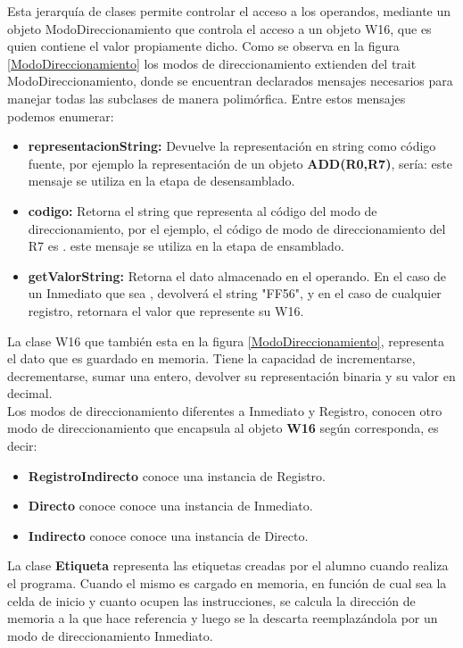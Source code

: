 Esta jerarquía de clases permite controlar el acceso a los operandos, mediante un objeto ModoDireccionamiento que controla el acceso a un objeto W16, que es quien contiene el valor propiamente dicho. 
Como se observa en la figura \ref{ModoDireccionamiento} los modos de direccionamiento extienden del trait ModoDireccionamiento, donde se encuentran declarados mensajes necesarios para manejar todas las subclases de manera polimórfica. Entre estos mensajes podemos enumerar:
\begin{itemize}
\item  \textbf{representacionString:}
Devuelve la representación en string como código fuente, por ejemplo la representación de un objeto
 \textbf{ADD(R0,R7)}, sería:  este mensaje se utiliza en la etapa de desensamblado.
\item  \textbf{codigo:}
Retorna el string que representa al código del modo de direccionamiento, por el ejemplo, el código de modo de direccionamiento del R7 es . este mensaje se utiliza en la etapa de ensamblado.
\item  \textbf{getValorString:}
Retorna el dato almacenado en el operando. En el caso de un Inmediato que sea , devolverá el string "FF56", y en el caso de cualquier registro, retornara el valor que represente su W16.
\end{itemize}


La clase W16 que también esta en la figura \ref{ModoDireccionamiento}, representa el dato que es guardado en memoria. Tiene la capacidad de incrementarse, decrementarse, sumar una entero, devolver su representación binaria y su valor en decimal.\\

Los modos de direccionamiento diferentes a Inmediato y Registro, conocen otro modo de direccionamiento que encapsula al objeto \textbf{W16} según corresponda, es decir:
\begin{itemize}
\item \textbf{RegistroIndirecto} conoce una instancia de Registro.
\item \textbf{Directo} conoce conoce una instancia de Inmediato.
\item \textbf{Indirecto} conoce conoce una instancia de Directo.
\end{itemize}

La clase \textbf{Etiqueta} representa las etiquetas creadas por el alumno cuando realiza el programa. Cuando el mismo es cargado en memoria, en función de cual sea la celda de inicio y cuanto ocupen las instrucciones, se calcula la dirección de memoria a la que hace referencia y luego se la descarta reemplazándola por un modo de direccionamiento Inmediato.

